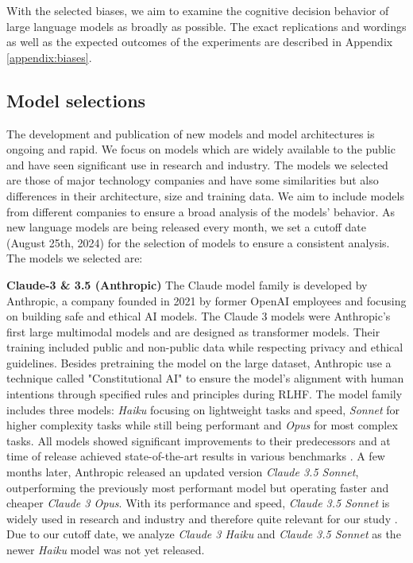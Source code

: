 \setlength{\parindent}{0pt}
\par With the selected biases, we aim to examine the cognitive decision behavior of large language models as broadly as possible. The exact replications and wordings as well as the expected outcomes of the experiments are described in Appendix \ref{appendix:biases}.


\subsection{Model selections}
\par The development and publication of new models and model architectures is ongoing and rapid. We focus on models which are widely available to the public and have seen significant use in research and industry. The models we selected are those of major technology companies and have some similarities but also differences in their architecture, size and training data. We aim to include models from different companies to ensure a broad analysis of the models' behavior. As new language models are being released every month, we set a cutoff date (August 25th, 2024) for the selection of models to ensure a consistent analysis. The models we selected are:

\setlength{\parindent}{20pt}
\par \textbf{Claude-3 \& 3.5 (Anthropic)} The Claude model family is developed by Anthropic, a company founded in 2021 by former OpenAI employees and focusing on building safe and ethical AI models. The Claude 3 models were Anthropic's first large multimodal models and are designed as transformer models. Their training included public and non-public data while respecting privacy and ethical guidelines. Besides pretraining the model on the large dataset, Anthropic use a technique called "Constitutional AI" to ensure the model's alignment with human intentions through specified rules and principles during RLHF. The model family includes three models: \textit{Haiku} focusing on lightweight tasks and speed, \textit{Sonnet} for higher complexity tasks while still being performant and \textit{Opus} for most complex tasks. All models showed significant improvements to their predecessors and  at time of release achieved state-of-the-art results in various benchmarks \parencite{anthropic2024claude}. A few months later, Anthropic released an updated version \textit{Claude 3.5 Sonnet}, outperforming the previously most performant model but operating faster and cheaper \textit{Claude 3 Opus}. With its performance and speed, \textit{Claude 3.5 Sonnet} is widely used in research and industry and therefore quite relevant for our study \parencite{anthropic2024claude2}. Due to our cutoff date, we analyze \textit{Claude 3 Haiku} and \textit{Claude 3.5 Sonnet} as the newer \textit{Haiku} model was not yet released. 

